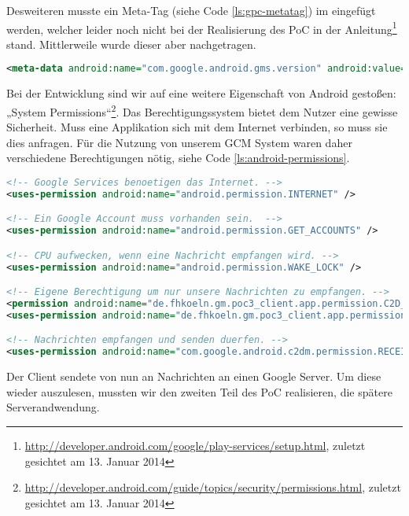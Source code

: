 Desweiteren musste ein Meta-Tag (siehe Code \ref{ls:gpc-metatag}) im eingefügt werden, welcher leider noch nicht bei der Realisierung des PoC in der Anleitung\footnote{\url{http://developer.android.com/google/play-services/setup.html}, zuletzt gesichtet am 13. Januar 2014} stand. Mittlerweile wurde dieser aber nachgetragen.

\begin{lstlisting}[label=ls:gpc-metatag,caption=Meta-Tag für Google Play Services in AndroidManifest.xml,language=XML]
<meta-data android:name="com.google.android.gms.version" android:value="@integer/google_play_services_version" />
\end{lstlisting}

Bei der Entwicklung sind wir auf eine weitere Eigenschaft von Android gestoßen: „System Permissions“\footnote{\url{http://developer.android.com/guide/topics/security/permissions.html}, zuletzt gesichtet am 13. Januar 2014}. Das Berechtigungssystem bietet dem Nutzer eine gewisse Sicherheit. Muss eine Applikation sich mit dem Internet verbinden, so muss sie dies anfragen. Für die Nutzung von unserem GCM System waren daher verschiedene Berechtigungen nötig, siehe Code \ref{ls:android-permissions}.

\begin{lstlisting}[label=ls:android-permissions,caption=Meta-Tag für Google Play Services in AndroidManifest.xml,language=XML]
<!-- Google Services benoetigen das Internet. -->
<uses-permission android:name="android.permission.INTERNET" />

<!-- Ein Google Account muss vorhanden sein.  -->
<uses-permission android:name="android.permission.GET_ACCOUNTS" />

<!-- CPU aufwecken, wenn eine Nachricht empfangen wird. -->
<uses-permission android:name="android.permission.WAKE_LOCK" />

<!-- Eigene Berechtigung um nur unsere Nachrichten zu empfangen. -->
<permission android:name="de.fhkoeln.gm.poc3_client.app.permission.C2D_MESSAGE" android:protectionLevel="signature" />
<uses-permission android:name="de.fhkoeln.gm.poc3_client.app.permission.C2D_MESSAGE" />

<!-- Nachrichten empfangen und senden duerfen. -->
<uses-permission android:name="com.google.android.c2dm.permission.RECEIVE" />
\end{lstlisting}


Der Client sendete von nun an Nachrichten an einen Google Server. Um diese wieder auszulesen, mussten wir den zweiten Teil des PoC realisieren, die spätere Serverandwendung.


